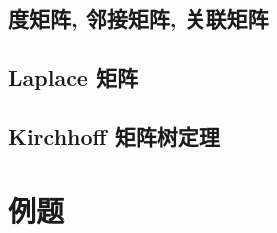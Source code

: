 \subsection*{度矩阵, 邻接矩阵, 关联矩阵}
\label{mtt:ssec:adjmat}



\subsection*{Laplace 矩阵}
\label{mtt:ssec:laplacemat}



\subsection*{Kirchhoff 矩阵树定理}
\label{mtt:ssec:mtt}



\section*{例题}
\label{mtt:sec:example}

